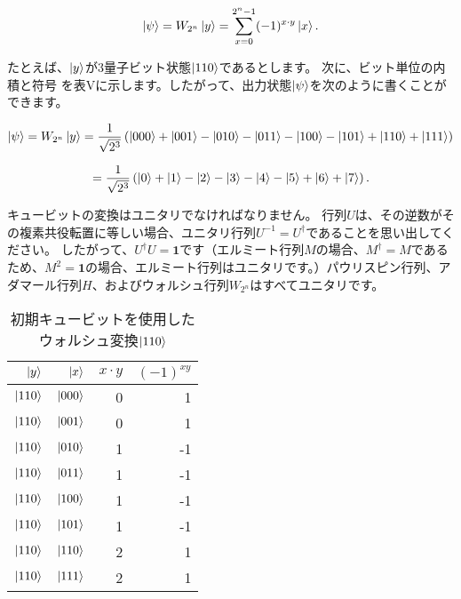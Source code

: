 \begin{equation}
\label{63}
\ket{\psi}
=
W_{2^n} \ket{y}
=
\sum_{x=0}^{2^n-1} (-1)^{x \cdot y} \ket{x}.
\end{equation}

たとえば、$\ket{y}$が3量子ビット状態$\ket{110}$であるとします。 次に、ビット単位の内積と符号
を表Vに示します。したがって、出力状態$\ket{\psi}$を次のように書くことができます。

\begin{equation}
\label{64}
\ket{\psi}
=
W_{2^n} \ket{y}
=
\frac{1}{\sqrt{2^3}}
\left(
\ket{000} + \ket{001} - \ket{010} - \ket{011} - \ket{100} - \ket{101}  + \ket{110} + \ket{111}
\right)
\end{equation}

\begin{equation}
\label{65}
=
\frac{1}{\sqrt{2^3}}
\left(
\ket{0} + \ket{1} - \ket{2} - \ket{3} - \ket{4} - \ket{5}  + \ket{6} + \ket{7}
\right).
\end{equation}


キュービットの変換はユニタリでなければなりません。 行列$U$は、その逆数がその複素共役転置に等しい場合、ユニタリ行列$U^{-1} = U^{\dag}$であることを思い出してください。 したがって、$ U^{\dag} U = \mathbf{1}$です（エルミート行列$M$の場合、$M^{\dag}= M$であるため、$M^2 = \mathbf{1}$の場合、エルミート行列はユニタリです。）パウリスピン行列、アダマール行列$H$、およびウォルシュ行列$W_{2^n}$はすべてユニタリです。

\begin{table}[htb]
\caption{初期キュービットを使用したウォルシュ変換$\ket{110}$}
\centering
\begin{tabular}{|r|r|r|r|} \hline
$\ket{y}$ & $\ket{x}$ & $x \cdot y$ & $(-1)^{xy}$ \\  \hline
$\ket{110}$ & $\ket{000}$ & 0 & 1  \\
$\ket{110}$ & $\ket{001}$ & 0 & 1  \\
$\ket{110}$ & $\ket{010}$ & 1 & -1  \\
$\ket{110}$ & $\ket{011}$ & 1 & -1  \\
$\ket{110}$ & $\ket{100}$ & 1 & -1  \\
$\ket{110}$ & $\ket{101}$ & 1 & -1  \\
$\ket{110}$ & $\ket{110}$ & 2 & 1  \\
$\ket{110}$ & $\ket{111}$ & 2 & 1  \\ \hline
\end{tabular}
\end{table} 



